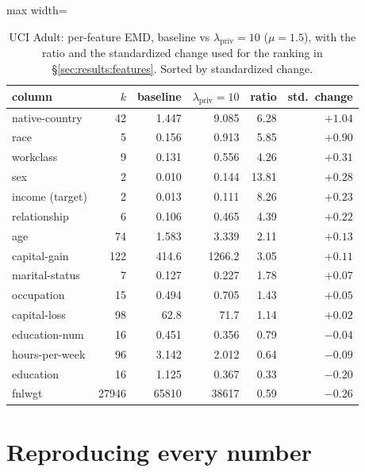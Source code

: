 \documentclass[11pt,a4paper]{article}
\newcommand{\lpriv}{\lambda_{\text{priv}}}
\begin{document}
\begin{table}[htbp]
\caption{UCI Adult: per-feature EMD, baseline vs $\lpriv = 10$ ($\mu = 1.5$),
with the ratio and the standardized change used for the ranking in
\S\ref{sec:results:features}. Sorted by standardized change.}
\label{tab:feat-adult}
\centering\small
\begin{adjustbox}{max width=\textwidth}
\begin{tabular}{@{}lrrrrr@{}}
\toprule
column & $k$ & baseline & $\lpriv{=}10$ & ratio & std.\ change \\
\midrule
native-country & 42    & 1.447   & 9.085   & 6.28 & $+1.04$ \\
race           & 5     & 0.156   & 0.913   & 5.85 & $+0.90$ \\
workclass      & 9     & 0.131   & 0.556   & 4.26 & $+0.31$ \\
sex            & 2     & 0.010   & 0.144   & 13.81 & $+0.28$ \\
income (target)& 2     & 0.013   & 0.111   & 8.26 & $+0.23$ \\
relationship   & 6     & 0.106   & 0.465   & 4.39 & $+0.22$ \\
age            & 74    & 1.583   & 3.339   & 2.11 & $+0.13$ \\
capital-gain   & 122   & 414.6   & 1266.2  & 3.05 & $+0.11$ \\
marital-status & 7     & 0.127   & 0.227   & 1.78 & $+0.07$ \\
occupation     & 15    & 0.494   & 0.705   & 1.43 & $+0.05$ \\
capital-loss   & 98    & 62.8    & 71.7    & 1.14 & $+0.02$ \\
education-num  & 16    & 0.451   & 0.356   & 0.79 & $-0.04$ \\
hours-per-week & 96    & 3.142   & 2.012   & 0.64 & $-0.09$ \\
education      & 16    & 1.125   & 0.367   & 0.33 & $-0.20$ \\
fnlwgt         & 27946 & 65810   & 38617   & 0.59 & $-0.26$ \\
\bottomrule
\end{tabular}
\end{adjustbox}
\end{table}

\section{Reproducing every number}
\label{app:repro}
\end{document}
